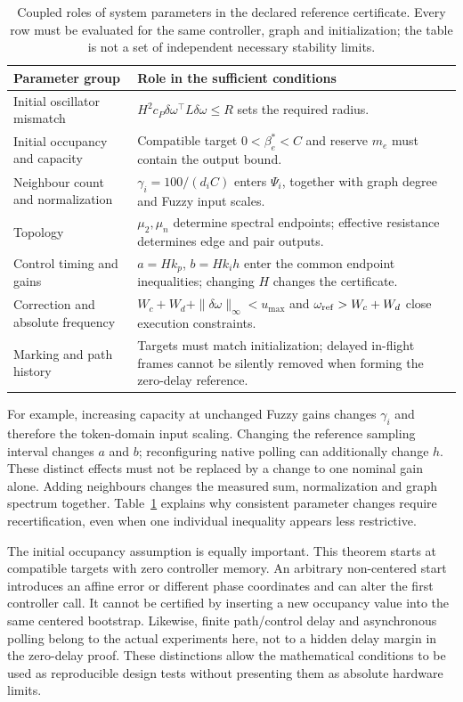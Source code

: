 \begin{table}[t]
\caption{Coupled roles of system parameters in the declared reference certificate.
Every row must be evaluated for the same controller, graph and initialization;
the table is not a set of independent necessary stability limits.}
\label{tab:parameter_roles}
\centering
\begin{tabular}{@{}lp{}@{}}\toprule
Parameter group & Role in the sufficient conditions\\\midrule
Initial oscillator mismatch & $H^2c_P\delta\omega^\top L\delta\omega\le R$ sets the required radius.\\
Initial occupancy and capacity & Compatible target $0<\beta_e^*<C$ and reserve $m_e$ must contain the output bound.\\
Neighbour count and normalization & $\gamma_i=100/(d_iC)$ enters $\Psi_i$, together with graph degree and Fuzzy input scales.\\
Topology & $\mu_2,\mu_n$ determine spectral endpoints; effective resistance determines edge and pair outputs.\\
Control timing and gains & $a=Hk_p$, $b=Hk_ih$ enter the common endpoint inequalities; changing $H$ changes the certificate.\\
Correction and absolute frequency & $W_c+W_d+\|\delta\omega\|_\infty<u_{\max}$ and $\omega_{\rm ref}>W_c+W_d$ close execution constraints.\\
Marking and path history & Targets must match initialization; delayed in-flight frames cannot be silently removed when forming the zero-delay reference.\\\bottomrule
\end{tabular}
\end{table}

For example, increasing capacity at unchanged Fuzzy gains changes
$\gamma_i$ and therefore the token-domain input scaling. Changing
the reference sampling interval changes $a$ and $b$; reconfiguring
native polling can additionally change $h$. These distinct effects
must not be replaced by a change to one nominal gain alone. Adding neighbours
changes the measured sum, normalization and graph spectrum together.
Table~\ref{tab:parameter_roles} explains why consistent parameter
changes require recertification, even when one individual inequality
appears less restrictive.

The initial occupancy assumption is equally important. This theorem
starts at compatible targets with zero controller memory. An arbitrary
non-centered start introduces an affine error or different phase
coordinates and can alter the first controller call. It cannot be
certified by inserting a new occupancy value into the same centered
bootstrap. Likewise, finite path/control delay and asynchronous
polling belong to the actual experiments here, not to a hidden
delay margin in the zero-delay proof. These distinctions allow the
mathematical conditions to be used as reproducible design tests
without presenting them as absolute hardware limits.

